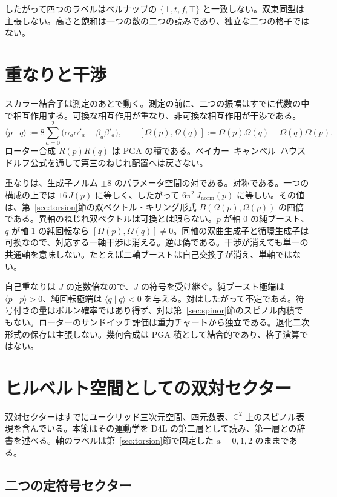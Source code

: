 \documentclass[a4paper]{article}
\theoremstyle{definition}
\newcommand{\Jnorm}{J_{\mathrm{norm}}}
\begin{document}
したがって四つのラベルはベルナップの \(\{\bot,t,f,\top\}\) と一致しない。双束同型は主張しない。高さと飽和は一つの数の二つの読みであり、独立な二つの格子ではない。

\section{重なりと干渉}
\label{sec:geo}

スカラー結合子は測定のあとで動く。測定の前に、二つの振幅はすでに代数の中で相互作用する。可換な相互作用が重なり、非可換な相互作用が干渉である。
\[
\langle p\mid q\rangle := 8\sum_{a=0}^{2}\bigl(\alpha_a\alpha'_a-\beta_a\beta'_a\bigr),
\qquad
[\Omega(p),\Omega(q)] := \Omega(p)\Omega(q)-\Omega(q)\Omega(p).
\]
ローター合成 \(R(p)R(q)\) は PGA の積である。ベイカー--キャンベル--ハウスドルフ公式を通して第三のねじれ配置へは戻さない。

重なりは、生成子ノルム \(\pm 8\) のパラメータ空間の対である。対称である。一つの構成の上では \(16\,J(p)\) に等しく、したがって \(6\pi^2\,\Jnorm(p)\) に等しい。その値は、第~\ref{sec:torsion}節の双ベクトル・キリング形式 \(B(\Omega(p),\Omega(p))\) の四倍である。異軸のねじれ双ベクトルは可換とは限らない。\(p\) が軸 \(0\) の純ブースト、\(q\) が軸 \(1\) の純回転なら \([\Omega(p),\Omega(q)]\ne 0\)。同軸の双曲生成子と循環生成子は可換なので、対応する一軸干渉は消える。逆は偽である。干渉が消えても単一の共通軸を意味しない。たとえば二軸ブーストは自己交換子が消え、単軸ではない。

自己重なりは \(J\) の定数倍なので、\(J\) の符号を受け継ぐ。純ブースト極端は \(\langle p\mid p\rangle>0\)、純回転極端は \(\langle q\mid q\rangle<0\) を与える。対はしたがって不定である。符号付きの量はボルン確率ではあり得ず、対は第~\ref{sec:spinor}節のスピノル内積でもない。ローターのサンドイッチ評価は重力チャートから独立である。退化二次形式の保存は主張しない。幾何合成は PGA 積として結合的であり、格子演算ではない。

\section{ヒルベルト空間としての双対セクター}
\label{sec:hilbert}

双対セクターはすでにユークリッド三次元空間、四元数表、\(\mathbb{C}^2\) 上のスピノル表現を含んでいる。本節はその運動学を D4L の第二層として読み、第一層との辞書を述べる。軸のラベルは第~\ref{sec:torsion}節で固定した \(a=0,1,2\) のままである。

\subsection{二つの定符号セクター}
\label{sec:sector}
\end{document}

